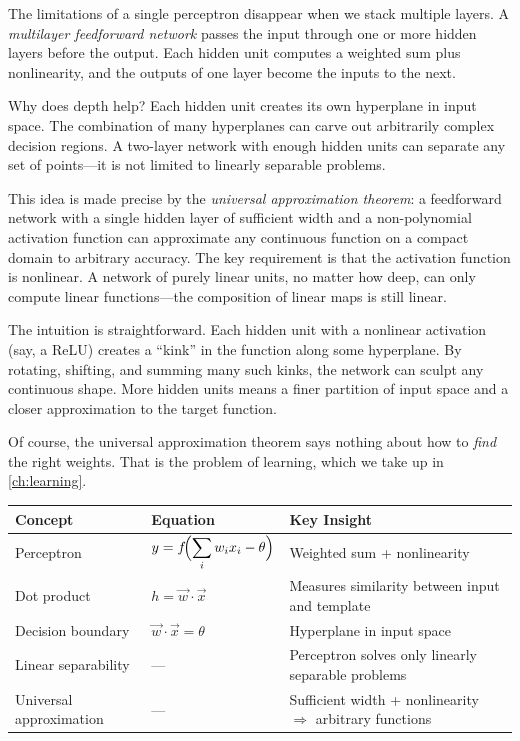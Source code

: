 The limitations of a single perceptron disappear when we stack multiple layers. A \emph{multilayer feedforward network} passes the input through one or more hidden layers before the output. Each hidden unit computes a weighted sum plus nonlinearity, and the outputs of one layer become the inputs to the next.

Why does depth help? Each hidden unit creates its own hyperplane in input space. The combination of many hyperplanes can carve out arbitrarily complex decision regions. A two-layer network with enough hidden units can separate any set of points---it is not limited to linearly separable problems.

This idea is made precise by the \emph{universal approximation theorem}: a feedforward network with a single hidden layer of sufficient width and a non-polynomial activation function can approximate any continuous function on a compact domain to arbitrary accuracy. The key requirement is that the activation function is nonlinear. A network of purely linear units, no matter how deep, can only compute linear functions---the composition of linear maps is still linear.

The intuition is straightforward. Each hidden unit with a nonlinear activation (say, a ReLU) creates a ``kink'' in the function along some hyperplane. By rotating, shifting, and summing many such kinks, the network can sculpt any continuous shape. More hidden units means a finer partition of input space and a closer approximation to the target function.

Of course, the universal approximation theorem says nothing about how to \emph{find} the right weights. That is the problem of learning, which we take up in \cref{ch:learning}.


\begin{chaptersummary}

\begin{center}
\renewcommand{\arraystretch}{1.6}
\begin{tabularx}{\textwidth}{@{}l X X@{}}
  \toprule
  \textbf{Concept} & \textbf{Equation} & \textbf{Key Insight} \\
  \midrule
  Perceptron &
  $\displaystyle y = f\!\Bigl(\sum_i w_i x_i - \theta\Bigr)$ &
  Weighted sum + nonlinearity \\
  Dot product &
  $h = \vec{w} \cdot \vec{x}$ &
  Measures similarity between input and template \\
  Decision boundary &
  $\vec{w} \cdot \vec{x} = \theta$ &
  Hyperplane in input space \\
  Linear separability &
  --- &
  Perceptron solves only linearly separable problems \\
  Universal approximation &
  --- &
  Sufficient width + nonlinearity $\Rightarrow$ arbitrary functions \\
  \bottomrule
\end{tabularx}
\end{center}

\end{chaptersummary}

